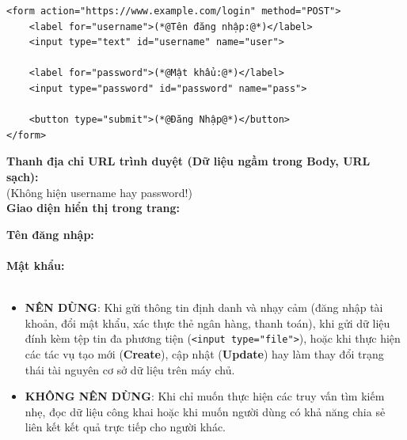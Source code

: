 \documentclass[11pt,oneside]{book}
\newcommand{\codeinline}[1]{\textcolor{accentOrange}{\texttt{#1}}}
\newcommand{\term}[1]{\textbf{\textcolor{primaryBlue}{#1}}}
\begin{document}
\begin{codeWindow}
\begin{lstlisting}[language=HTML5]
<form action="https://www.example.com/login" method="POST">
    <label for="username">(*@Tên đăng nhập:@*)</label>
    <input type="text" id="username" name="user">
    
    <label for="password">(*@Mật khẩu:@*)</label>
    <input type="password" id="password" name="pass">
    
    <button type="submit">(*@Đăng Nhập@*)</button>
</form>
\end{lstlisting}
\end{codeWindow}

\begin{browserWindow}
\sffamily\small
\textbf{Thanh địa chỉ URL trình duyệt (Dữ liệu ngầm trong Body, URL sạch):} \\[3pt]
 \;\textcolor{codeComment}{(Không hiện username hay password!)} \\[10pt]
\textbf{Giao diện hiển thị trong trang:} \\[4pt]
\begin{tcolorbox}[colback=white, colframe=primaryBlue!20, arc=4pt, boxrule=0.6pt, left=10pt, right=10pt, top=8pt, bottom=8pt]
  \textbf{Tên đăng nhập:} \\[2pt]
  \tcbox[on line, arc=3pt, colback=codeBg, colframe=codeBorder, boxsep=2pt, left=8pt, right=50pt]{\textcolor{darkText}{admin\_user}} \\[6pt]
  \textbf{Mật khẩu:} \\[2pt]
  \tcbox[on line, arc=3pt, colback=codeBg, colframe=codeBorder, boxsep=2pt, left=8pt, right=50pt]{\textcolor{darkText}{$\bullet\bullet\bullet\bullet\bullet\bullet$}} \\[10pt]
\end{tcolorbox}
\end{browserWindow}

\begin{tipBox}
\begin{itemize}[leftmargin=1.5em, itemsep=3pt, parsep=0pt]
    \item \textbf{NÊN DÙNG}: Khi gửi thông tin định danh và nhạy cảm (đăng nhập tài khoản, đổi mật khẩu, xác thực thẻ ngân hàng, thanh toán), khi gửi dữ liệu đính kèm tệp tin đa phương tiện (\codeinline{<input type="file">}), hoặc khi thực hiện các tác vụ tạo mới (\term{Create}), cập nhật (\term{Update}) hay làm thay đổi trạng thái tài nguyên cơ sở dữ liệu trên máy chủ.
    \item \textbf{KHÔNG NÊN DÙNG}: Khi chỉ muốn thực hiện các truy vấn tìm kiếm nhẹ, đọc dữ liệu công khai hoặc khi muốn người dùng có khả năng chia sẻ liên kết kết quả trực tiếp cho người khác.
\end{itemize}
\end{tipBox}
\end{document}
